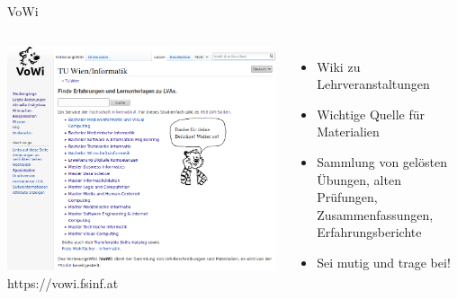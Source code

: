 \documentclass{beamer}
\begin{document}
\begin{frame}{VoWi}
  \begin{columns}
      \centering
      \includegraphics[width=\textwidth]{vowi.png}
      https://vowi.fsinf.at
      \begin{itemize}
        \item Wiki zu Lehrveranstaltungen
        \item Wichtige Quelle für Materialien
        \item Sammlung von gelösten Übungen, alten Prüfungen, Zusammenfassungen,
            Erfahrungsberichte
        \item Sei mutig und trage bei!
      \end{itemize}
  \end{columns}
\end{frame}
\end{document}
